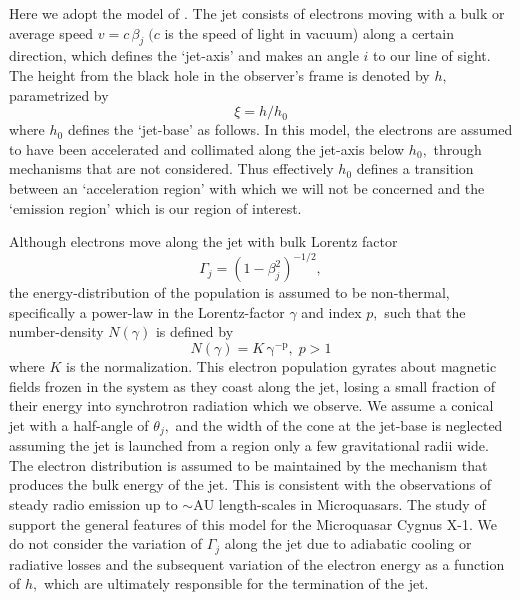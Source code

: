 Here we adopt the model of \citealt{Zdziarski_et_al.-2012-MNRAS-MeV_tail_CX1}. The jet consists of electrons moving with a bulk or average speed $ v = c \, \beta_j \; (c $  is the speed of light in vacuum) along a certain direction, which defines the `jet-axis' and makes an angle $ i $ to our line of sight. The height from the black hole in the observer's frame is denoted by $ h, $ parametrized by
\begin{equation}
\xi = h / h_0 \label{eq:xi_definition}
\end{equation}
where $ h_0 $ defines the `jet-base' as follows. In this model, the electrons are assumed to have been accelerated and collimated along the jet-axis below $ h_0 , $ through mechanisms that are not considered. Thus effectively $ h_0 $ defines a transition between an `acceleration region' with which we will not be concerned and the `emission region' which is our region of interest.

Although electrons move along the jet with bulk Lorentz factor
\begin{equation}
\Gamma_j = \left(1-\beta_j^{2}\right)^{-1/2},
\end{equation} the energy-distribution of the population is assumed to be non-thermal, specifically a power-law in the Lorentz-factor $ \gamma $ and index $ p , $ such that the number-density $ N \left(\gamma\right) $ is defined by 
\begin{equation}
N \left(\gamma\right) = K\,\mathrm{\gamma^{-p}}, \; p > 1 \label{eq:energy-distribution}
\end{equation}
where $ K $ is the normalization. This electron population gyrates about magnetic fields frozen in the system as they coast along the jet, losing a small fraction of their energy into synchrotron radiation which we observe. We assume a conical jet with a half-angle of $ \theta_j , $ and the width of the cone at the jet-base is neglected assuming the jet is launched from a region only a few gravitational radii wide. The electron distribution is assumed to be maintained by the mechanism that produces the bulk energy of the jet. This is consistent with the observations of steady radio emission up to $ \sim \mathrm{AU} $ length-scales in Microquasars. The study of \citealt{Russell_&_Shahbaz-2014-MNRAS} support the general features of this model for the Microquasar Cygnus X-1. We do not consider the variation of $ \Gamma_j $ along the jet due to adiabatic cooling or radiative losses and the subsequent variation of the electron energy as a function of $ h, $ which are ultimately responsible for the termination of the jet.

